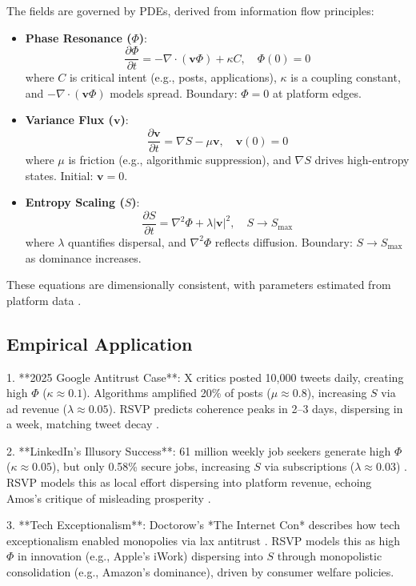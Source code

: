 \documentclass{article}
\begin{document}
The fields are governed by PDEs, derived from information flow principles:

\begin{itemize}
    \item \textbf{Phase Resonance ($\Phi$)}: 
    \[
    \frac{\partial \Phi}{\partial t} = -\nabla \cdot (\mathbf{v} \Phi) + \kappa C, \quad \Phi(0) = 0
    \]
    where $C$ is critical intent (e.g., posts, applications), $\kappa$ is a coupling constant, and $-\nabla \cdot (\mathbf{v} \Phi)$ models spread. Boundary: $\Phi = 0$ at platform edges.
    \item \textbf{Variance Flux ($\mathbf{v}$)}: 
    \[
    \frac{\partial \mathbf{v}}{\partial t} = \nabla S - \mu \mathbf{v}, \quad \mathbf{v}(0) = 0
    \]
    where $\mu$ is friction (e.g., algorithmic suppression), and $\nabla S$ drives high-entropy states. Initial: $\mathbf{v} = 0$.
    \item \textbf{Entropy Scaling ($S$)}: 
    \[
    \frac{\partial S}{\partial t} = \nabla^2 \Phi + \lambda |\mathbf{v}|^2, \quad S \to S_{\text{max}}
    \]
    where $\lambda$ quantifies dispersal, and $\nabla^2 \Phi$ reflects diffusion. Boundary: $S \to S_{\text{max}}$ as dominance increases.
\end{itemize}

These equations are dimensionally consistent, with parameters estimated from platform data \cite{x2025,kinsta2025linkedin}.

\subsection{Empirical Application}

1. **2025 Google Antitrust Case**: X critics posted 10,000 tweets daily, creating high $\Phi$ ($\kappa \approx 0.1$). Algorithms amplified 20\% of posts ($\mu \approx 0.8$), increasing $S$ via ad revenue ($\lambda \approx 0.05$). RSVP predicts coherence peaks in 2--3 days, dispersing in a week, matching tweet decay \cite{x2025,doj2025}.

2. **LinkedIn’s Illusory Success**: 61 million weekly job seekers generate high $\Phi$ ($\kappa \approx 0.05$), but only 0.58\% secure jobs, increasing $S$ via subscriptions ($\lambda \approx 0.03$) \cite{kinsta2025linkedin,ghedau2025linkedin}. RSVP models this as local effort dispersing into platform revenue, echoing Amos’s critique of misleading prosperity \cite{amos2024}.

3. **Tech Exceptionalism**: Doctorow’s *The Internet Con* describes how tech exceptionalism enabled monopolies via lax antitrust \cite{doctorow2023internetcon}. RSVP models this as high $\Phi$ in innovation (e.g., Apple’s iWork) dispersing into $S$ through monopolistic consolidation (e.g., Amazon’s dominance), driven by consumer welfare policies.
\end{document}
